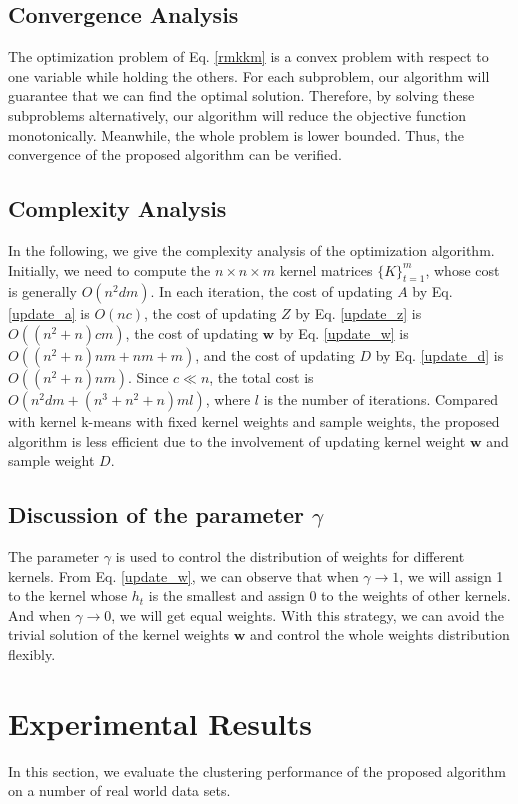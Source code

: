 \documentclass{article}
\begin{document}
\subsection{Convergence Analysis}
The optimization problem of Eq. \eqref{rmkkm} is a convex problem with respect to one variable while holding the others. For each subproblem, our algorithm will guarantee that we can find the optimal solution.
Therefore, by solving these subproblems alternatively, our algorithm will reduce the objective function monotonically. Meanwhile, the whole problem is lower bounded. Thus, the convergence of the proposed algorithm can be verified.

\subsection{Complexity Analysis}
In the following, we give the complexity analysis of the optimization algorithm. Initially, we need to compute the $n \times n \times m$ kernel matrices $\{K\}_{t=1}^{m}$, whose cost is generally $O(n^2dm)$. In each iteration, the cost of updating $A$ by Eq. \eqref{update_a} is $O(nc)$, the cost of updating $Z$ by Eq. \eqref{update_z} is $O((n^2+n)cm)$, the cost of updating $\bm{w}$ by Eq. \eqref{update_w} is $O((n^2+n)nm + nm + m)$, and the cost of updating $D$ by Eq. \eqref{update_d} is $O((n^2+n)nm)$. Since $c \ll n$, the total cost is $O(n^2dm + (n^3 + n^2 + n)ml)$, where $l$ is the number of iterations. Compared with kernel k-means with fixed kernel weights and sample weights, the proposed algorithm is less efficient due to the involvement of updating kernel weight $\bm{w}$ and sample weight $D$.
\subsection{Discussion of the parameter $\gamma$}
The parameter $\gamma$ is used to control the distribution of weights for different kernels. From Eq. \eqref{update_w}, we can observe that
when $\gamma \rightarrow 1$, we will assign 1 to the kernel whose $h_t$ is the smallest and assign 0 to the weights of other kernels. And when $\gamma \rightarrow 0$, we will get equal weights.
With this strategy, we can avoid the trivial solution of the kernel weights $\bm{w}$ and control the whole weights distribution flexibly.
\section{Experimental Results}
In this section, we evaluate the clustering performance of the proposed algorithm on a number of real world data sets.
\end{document}
